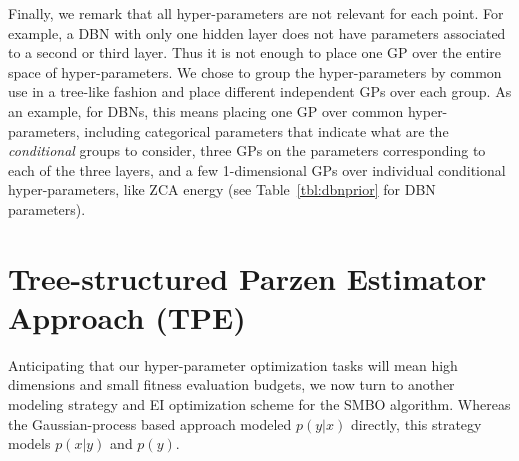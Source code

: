 \documentclass{article}
\newcommand{\vs}[1]{\vspace*{-#1mm}}
\newcommand{\Bss}{\vs{1}}
\newcommand{\ass}{\vs{0.7}}
\begin{document}
Finally, we remark that all hyper-parameters are not relevant for each
point. For example, a DBN with only
one hidden layer does not have parameters associated to a second or
third layer. Thus it is not enough to place one GP over the entire
space of hyper-parameters. We chose to group the hyper-parameters by
common use in a tree-like fashion and place different independent GPs
over each group. As an example, for DBNs, this means placing one GP over common
hyper-parameters, including categorical parameters that indicate what
are the {\it conditional} groups to consider, three GPs on the
parameters corresponding to each of the three layers, and a few 1-dimensional GPs
over individual conditional hyper-parameters, like ZCA
energy (see Table~\ref{tbl:dbnprior} for DBN parameters).

\Bss
\section{Tree-structured Parzen Estimator Approach (TPE)}
\label{sec:TPE}
\ass

Anticipating that our hyper-parameter optimization tasks will mean high
dimensions and small fitness evaluation budgets, we now turn to
another modeling strategy and EI optimization scheme for the SMBO algorithm.
Whereas the Gaussian-process based approach modeled $p(y|x)$ directly,
this strategy models $p(x|y)$ and $p(y)$.
\end{document}
